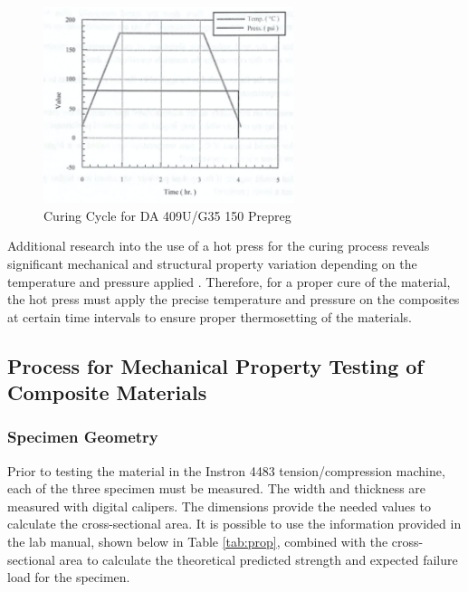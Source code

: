 \begin{figure}[!h]
    \centering
    \includegraphics[width=0.65\textwidth]{Pictures/Procedure/mariecuring.png}
    \caption{Curing Cycle for DA 409U/G35 150 Prepreg \cite{labmanual}}
    \label{fig:mariecuring}
\end{figure}

Additional research into the use of a hot press for the curing process reveals significant mechanical and structural property variation depending on the temperature and pressure applied \cite{curematters}.  Therefore, for a proper cure of the material, the hot press must apply the precise temperature and pressure on the composites at certain time intervals to ensure proper thermosetting of the materials.

\clearpage
\subsection{Process for Mechanical Property Testing of Composite Materials}
\subsubsection{Specimen Geometry}
Prior to testing the material in the Instron 4483 tension/compression machine, each of the three specimen must be measured.  The width and thickness are measured with digital calipers.  The dimensions provide the needed values to calculate the cross-sectional area.  It is possible to use the information provided in the lab manual, shown below in Table \ref{tab:prop}, combined with the cross-sectional area to calculate the theoretical predicted strength and expected failure load for the specimen.

